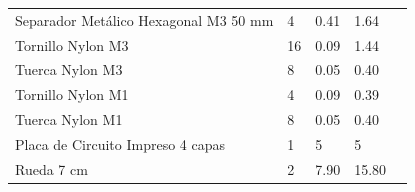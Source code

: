 \begin{table}[H]
\begin{tabular}{|l|l|l|l|l}
		Separador Metálico Hexagonal M3 50 mm                           & 4                                         & 0.41                                                                                                                & 1.64                                                                                                             &  \\ \cline{1-4}
		Tornillo Nylon M3                                               & 16                                        & 0.09                                                                                                                & 1.44                                                                                                             &  \\ \cline{1-4}
		Tuerca Nylon M3                                                 & 8                                         & 0.05                                                                                                                & 0.40                                                                                                             &  \\ \cline{1-4}
		Tornillo Nylon M1                                               & 4                                         & 0.09                                                                                                                & 0.39                                                                                                             &  \\ \cline{1-4}
		Tuerca Nylon M1                                                 & 8                                         & 0.05                                                                                                                & 0.40                                                                                                             &  \\ \cline{1-4}
		Placa de Circuito Impreso 4 capas                               & 1                                         & 5                                                                                                                   & 5                                                                                                                &  \\ \cline{1-4}
		Rueda 7 cm                                                      & 2                                         & 7.90                                                                                                                & 15.80                                                                                                            &  \\ \cline{1-4}

\end{tabular}
\end{table}
